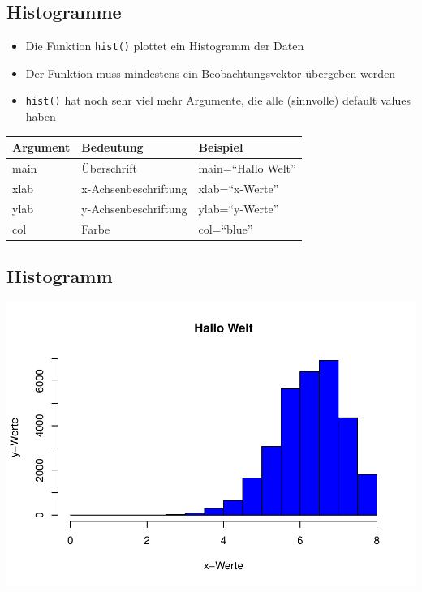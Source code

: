 \documentclass[]{article}
\newenvironment{Shaded}{\begin{snugshade}}{\end{snugshade}}
\newcommand{\KeywordTok}[1]{\textcolor[rgb]{0.13,0.29,0.53}{\textbf{{#1}}}}
\newcommand{\DataTypeTok}[1]{\textcolor[rgb]{0.13,0.29,0.53}{{#1}}}
\newcommand{\StringTok}[1]{\textcolor[rgb]{0.31,0.60,0.02}{{#1}}}
\newcommand{\NormalTok}[1]{{#1}}
\providecommand{\tightlist}{%
  \setlength{\itemsep}{0pt}\setlength{\parskip}{0pt}}
\begin{document}
\subsection{Histogramme}\label{histogramme}

\begin{itemize}
\tightlist
\item
  Die Funktion \texttt{hist()} plottet ein Histogramm der Daten
\item
  Der Funktion muss mindestens ein Beobachtungsvektor übergeben werden
\item
  \texttt{hist()} hat noch sehr viel mehr Argumente, die alle
  (sinnvolle) default values haben
\end{itemize}

\begin{longtable}[]{@{}lll@{}}
\toprule
Argument & Bedeutung & Beispiel\tabularnewline
\midrule
\endhead
main & Überschrift & main=``Hallo Welt''\tabularnewline
xlab & x-Achsenbeschriftung & xlab=``x-Werte''\tabularnewline
ylab & y-Achsenbeschriftung & ylab=``y-Werte''\tabularnewline
col & Farbe & col=``blue''\tabularnewline
\bottomrule
\end{longtable}

\subsection{Histogramm}\label{histogramm}

\begin{Shaded}
\end{Shaded}

\includegraphics{Intro_Datenanalyse1_files/figure-latex/unnamed-chunk-142-1.pdf}
\end{document}
